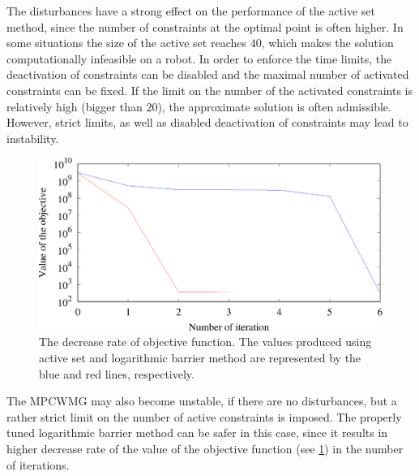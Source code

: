 The disturbances have a strong effect on the performance of the active set method, since
the number of constraints at the optimal point is often higher. In some situations the size
of the active set reaches $40$, which makes the solution computationally infeasible on a 
robot. In order to enforce the time limits, the deactivation of constraints can be disabled 
and the maximal number of activated constraints can be fixed. If the limit on the number 
of the activated constraints is relatively high (bigger than $20$), the approximate solution 
is often admissible. However, strict limits, as well as disabled deactivation of constraints
may lead to instability.

\begin{figure}[ht]
    \centerline{%
    \includegraphics[scale=0.5]{Figures/obj_asip.eps}}
    \caption[The decrease rate of objective function]{The decrease rate of objective 
    function. The values produced using active set and logarithmic barrier method 
    are represented by the blue and red lines, respectively.}
    \label{fig.obj_asip}
\end{figure}

The \ac{MPCWMG} may also become unstable, if there are no disturbances, but a rather 
strict limit on the number of active constraints is imposed. The properly tuned
logarithmic barrier method can be safer in this case, since it results in higher 
decrease rate of the value of the objective function (see \cref{fig.obj_asip})
in the number of iterations.
